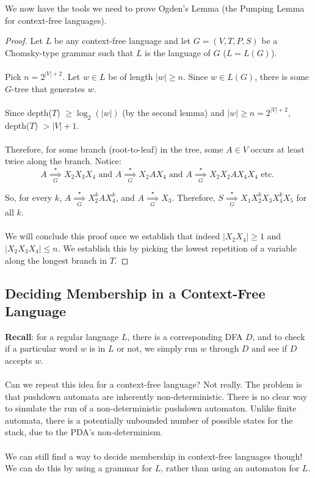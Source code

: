 \documentclass[]{article}
\theoremstyle{definition}
\newcommand{\lecture}[1]{\marginpar{{\footnotesize $\leftarrow$ \underline{#1}}}}
\begin{document}
      We now have the tools we need to prove Ogden's Lemma (the Pumping Lemma for context-free languages).
      \begin{proof}
        Let $L$ be any context-free language and let $G = (V, T, P, S)$ be a Chomsky-type grammar such that $L$ is the language of $G$ ($L = L(G)$).
        \\ \\
        Pick $n = 2^{|V| + 2}$. Let $w \in L$ be of length $|w| \ge n$. Since $w \in L(G)$, there is some $G$-tree that generates $w$.
        \\ \\
        Since depth($T$) $\ge \log_2(|w|)$ (by the second lemma) and $|w| \ge n = 2^{|V| + 2}$, depth($T$) $> |V| + 1$.
        \\ \\
        Therefore, for some branch (root-to-leaf) in the tree, some $A \in V$ occurs at least twice along the branch. Notice:
        $$
          A \underset{G}{\overset{\star}{\implies}} X_2 X_3 X_4 \text{ and } A \underset{G}{\overset{\star}{\implies}} X_2 A X_4 \text{ and } A \underset{G}{\overset{\star}{\implies}} X_2 X_2 A X_4 X_4 \text{ etc. }
        $$

        So, for every $k$, $A \underset{G}{\overset{\star}{\implies}} X_2^k A X_4^k$, and $A \underset{G}{\overset{\star}{\implies}} X_3$. Therefore, $S \underset{G}{\overset{\star}{\implies}} X_1 X_2^k X_3 X_4^k X_5$ for all $k$.
        \\ \\
        We will conclude this proof once we establish that indeed $|X_2 X_4| \ge 1$ and $|X_2 X_3 X_4| \le n$. We establish this by picking the lowest repetition of a variable along the longest branch in $T$.
      \end{proof}

      \subsection{Deciding Membership in a Context-Free Language} \lecture{October 31, 2013}
        \textbf{Recall}: for a regular language $L$, there is a corresponding DFA $D$, and to check if a particular word $w$ is in $L$ or not, we simply run $w$ through $D$ and see if $D$ accepts $w$.
        \\ \\
        Can we repeat this idea for a context-free language? Not really. The problem is that pushdown automata are inherently non-deterministic. There is no clear way to simulate the run of a non-deterministic pushdown automaton. Unlike finite automata, there is a potentially unbounded number of possible states for the stack, due to the PDA's non-determinism.
        \\ \\
        We can still find a way to decide membership in context-free languages though! We can do this by using a grammar for $L$, rather than using an automaton for $L$.
\end{document}
